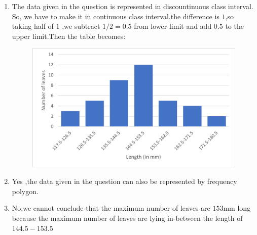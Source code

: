 \documentclass[12pt,twocolumn]{IEEEtran}
\begin{document}
\begin{enumerate}[label=(\roman*)]
	\item The data given in the question is represented in discountinuous class interval. So, we have to make it in continuous class interval.the difference is $1$,so taking half of $1$ ,we subtract $1/2=0.5$ from lower limit and add $0.5$ to the upper limit.Then the table becomes:
	      \begin{table}[ht!]
		      \begin{center}
			      
			      \vspace*{3pt}
			      \caption{}
			      \label{table:table2}
		      \end{center}
	      \end{table}
	      \begin{figure}[ht!]
		      \begin{center}
			      \includegraphics[width=\columnwidth]{fig/Picture1.png}
			      \caption{}
			      \label{fig:histogram}
		      \end{center}

	      \end{figure}
		  \pagebreak
	\item Yes ,the data given in the question can also be represented by frequency polygon.
	\item No,we cannot conclude that the maximum number of leaves are $153$mm long because the maximum number of leaves are lying in-between the length of $144.5-153.5$


\end{enumerate}
\end{document}
